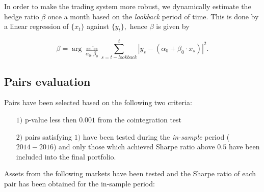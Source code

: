 \documentclass{paper}
\begin{document}
In order to make the trading system more robust, we dynamically estimate the hedge ratio $\beta$ once a month based on the \textit{lookback} period of time. This is done by a linear regression of $\{x_t\}$ against $\{y_t\},$ hence $\beta$ is given by

\begin{displaymath}
\beta = \arg \min_{\alpha_0, \beta_0} \sum_{s = t - \textit{lookback}}^t |y_s - (\alpha_0 + \beta_0 \cdot x_s)|^2.  
\end{displaymath}


\subsection{Pairs evaluation}

Pairs have been selected based on the following two criteria:

\begin{itemize}
\item[$1)$] p-value less then $0.001$ from the cointegration test
\item[$2)$] pairs satisfying $1)$ have been tested during the \textit{in-sample} period ($2014-2016$) and only those which achieved Sharpe ratio above $0.5$ have been included into the final portfolio.
\end{itemize}

Assets from the following markets have been tested and the Sharpe ratio of each pair has been obtained for the in-sample period:
\end{document}
